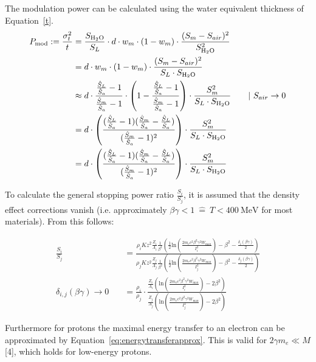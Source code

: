 \documentclass{article}
\begin{document}
The modulation power can be calculated using the water equivalent thickness of Equation~\ref{t}.
\begin{align}
    P_{\text{mod}} := \frac{\sigma_t^2}{t} &= \frac{S_{\ce{H2O}}}{S_{L}} \cdot d \cdot w_m\cdot (1-w_m)\cdot \frac{(S_m-S_{air})^2}{S_{\ce{H2O}}^2} \\
    &= d \cdot w_m\cdot (1-w_m)\cdot \frac{(S_m-S_{air})^2}{S_{L}\cdot S_{\ce{H2O}}} \\
    &\approx d \cdot \frac{\frac{\hat{S}_L}{\hat{S}_a}-1}{\frac{\hat{S}_m}{\hat{S}_a}-1}\cdot \left(1-\frac{\frac{\hat{S}_L}{\hat{S}_a}-1}{\frac{\hat{S}_m}{\hat{S}_a}-1}\right)\cdot \frac{S_m^2}{S_{L}\cdot S_{\ce{H2O}}} \qquad|~S_{air}\rightarrow{0} \\
    &= d \cdot \left(\frac{(\frac{\hat{S}_L}{\hat{S}_a}-1)(\frac{\hat{S}_m}{\hat{S}_a}-\frac{\hat{S}_L}{\hat{S}_a})}{(\frac{\hat{S}_m}{\hat{S}_a}-1)^2} \right)\cdot \frac{S_m^2}{S_{L}\cdot S_{\ce{H2O}}} \\
    &= d \cdot \left(\frac{(\frac{\hat{S}_L}{\hat{S}_a}-1)(\frac{\hat{S}_m}{\hat{S}_a}-\frac{\hat{S}_L}{\hat{S}_a})}{(\frac{\hat{S}_m}{\hat{S}_a}-1)^2} \right)\cdot \frac{S_m^2}{S_{L}\cdot S_{\ce{H2O}}} \label{eq:mod:ratio}
\end{align}

To calculate the general stopping power ratio $\frac{S_i}{S_j}$, it is assumed that the density effect corrections vanish (i.e. approximately $\beta\gamma < 1~\hat{=}~T < \SI{400}{\mega\electronvolt}$ for most materials).
From this follows:

\begin{align}
    \frac{S_i}{S_j} &= \frac{\rho_i Kz^2\frac{Z_i}{A_i}\frac{1}{\beta^2}\left(\frac{1}{2}\text{ln}\left(\frac{2m_ec^2\beta^2\gamma^2W_{\text{max}}}{I_i^2}\right)-\beta^2-\frac{\delta_i (\beta\gamma)}{2} \right)}{\rho_j Kz^2\frac{Z_j}{A_j}\frac{1}{\beta^2}\left(\frac{1}{2}\text{ln}\left(\frac{2m_ec^2\beta^2\gamma^2W_{\text{max}}}{I_j^2}\right)-\beta^2-\frac{\delta_j(\beta\gamma)}{2} \right)} \\
    \delta_{i,j}(\beta\gamma)\rightarrow{}0\quad &= \frac{\rho_i}{\rho_j} \cdot \frac{\frac{Z_i}{A_i}\left(\text{ln}\left(\frac{2m_ec^2\beta^2\gamma^2W_{\text{max}}}{I_{i}^2}\right)-2\beta^2\right)}{\frac{Z_j}{A_j}\left(\text{ln}\left(\frac{2m_ec^2\beta^2\gamma^2W_{\text{max}}}{I_j^2}\right)-2\beta^2\right)}
\end{align}

Furthermore for protons the maximal energy transfer to an electron can be approximated by Equation~\ref{eq:energytransferapprox}.
This is valid for $2\gamma m_e \ll M$[4], which holds for low-energy protons.
\end{document}

